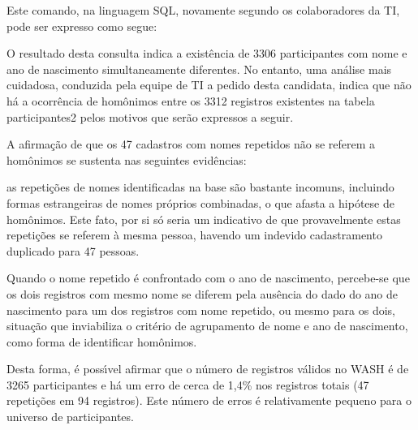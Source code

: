 \documentclass[
12pt,		%
openright,	%
twoside,  %
a4paper,			%
chapter=TITLE,		%
english,			%
french,				%
spanish,			%
brazil				%
]{USPSC-classe/USPSC_RedarTex}
\begin{document}
Este comando, na linguagem SQL, novamente segundo os colaboradores da TI, pode ser expresso como segue:









\noindent\begin{center}\mbox{\centering{}}\end{center}


O resultado desta consulta indica a exist\^encia de 3306 participantes com nome e ano de nascimento simultaneamente diferentes. No entanto, uma an\'alise mais cuidadosa, conduzida pela equipe de TI a pedido desta candidata, indica que n\~ao h\'a a ocorr\^encia de hom\^onimos entre os 3312 registros existentes na tabela  participantes2 pelos motivos que ser\~ao expressos a seguir.








A afirma\c{c}\~ao de que os 47 cadastros com nomes repetidos n\~ao se referem a hom\^onimos se sustenta nas seguintes evid\^encias:









\begin{alineas}
\item as repeti\c{c}\~oes de nomes identificadas na base s\~ao bastante incomuns, incluindo formas estrangeiras de nomes pr\'oprios combinadas, o que afasta a hip\'otese de hom\^onimos. Este fato, por si s\'o seria um indicativo de que provavelmente estas repeti\c{c}\~oes se referem \`a mesma pessoa, havendo um indevido cadastramento duplicado para 47 pessoas.
\item Quando o nome repetido \'e confrontado com o ano de nascimento, percebe-se que os dois registros com mesmo nome se diferem pela aus\^encia do dado do ano de nascimento para um dos registros com nome repetido, ou mesmo para os dois, situa\c{c}\~ao que inviabiliza o crit\'erio de agrupamento de nome e ano de nascimento, como forma de identificar hom\^onimos.
\end{alineas}

Desta forma, \'e poss\'{\i}vel afirmar que o n\'umero de registros v\'alidos no WASH \'e de 3265 participantes e h\'a um erro de cerca de 1,4\% nos registros totais (47 repeti\c{c}\~oes em 94 registros). Este n\'umero de erros \'e relativamente pequeno para o universo de participantes.
\end{document}
